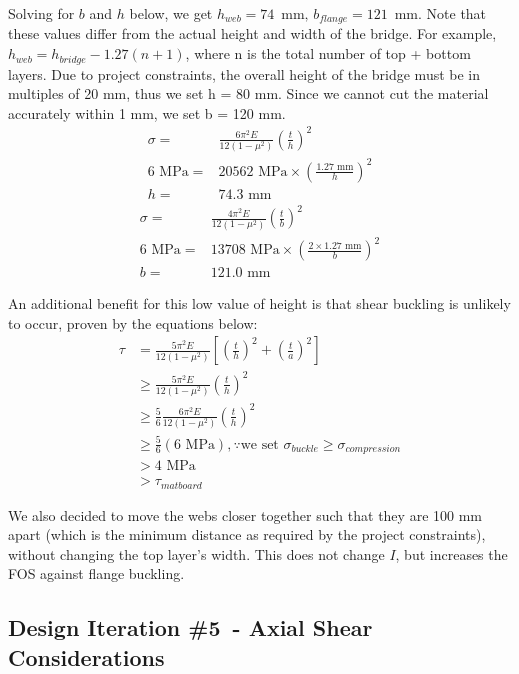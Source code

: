 \documentclass[prl,twocolumn,secnumarabic, amsmath,amssymb,superscriptaddress]{revtex4-2}
\begin{document}
Solving for $b$ and $h$ below, we get $h_{web} = 74\,\text{ mm, } b_{flange} = 121\,\text{ mm}$. Note that these values differ from the actual height and width of the bridge. For example, $h_{web} = h_{bridge} - 1.27(n+1)$, where n is the total number of top + bottom layers. Due to project constraints, the overall height of the bridge must be in multiples of 20 mm, thus we set h = 80 mm. Since we cannot cut the material accurately within 1 mm, we set b = 120 mm.
\begin{align*}
\sigma =& \frac{6\pi ^2E}{12(1-\mu^2)}\left(\frac{t}{h}\right)^2\\
6\text{ M{Pa}} =& 20562\text{ MPa}\times \left(\frac{1.27\text{ mm}}{h}\right)^2\\
h =& 74.3\text{ mm}
\end{align*}
\begin{align*}
\sigma =& \frac{4\pi ^2E}{12(1-\mu^2)}\left(\frac{t}{b}\right)^2\\
6\text{ M{Pa}} =& 13708\text{ MPa}\times \left(\frac{2\times1.27\text{ mm}}{b}\right)^2\\
b =& 121.0\text{ mm}
\end{align*}


An additional benefit for this low value of height is that shear buckling is unlikely to occur, proven by the equations below:
\begin{align*}
\tau &= \frac{5\pi^2E}{12(1-\mu^2)}\left[ \left(\frac{t}{h}\right)^2+ \left(\frac{t}{a}\right)^2 \right]\\
&\ge \frac{5\pi^2E}{12(1-\mu^2)} \left(\frac{t}{h}\right)^2\\
&\ge \frac{5}{6}\frac{6\pi^2E}{12(1-\mu^2)} \left(\frac{t}{h}\right)^2\\
&\ge \frac{5}{6}(6\text{ MPa}), \because\text{we set }\sigma_{buckle} \ge \sigma_{compression}\\
&> 4\text{ MPa}\\
&> \tau_{matboard}
\end{align*}

We also decided to move the webs closer together such that they are 100 mm apart (which is the minimum distance as required by the project constraints), without changing the top layer’s width. This does not change $I$, but increases the FOS against flange buckling.

\subsection{Design Iteration \#5\ - Axial Shear Considerations}
\end{document}
